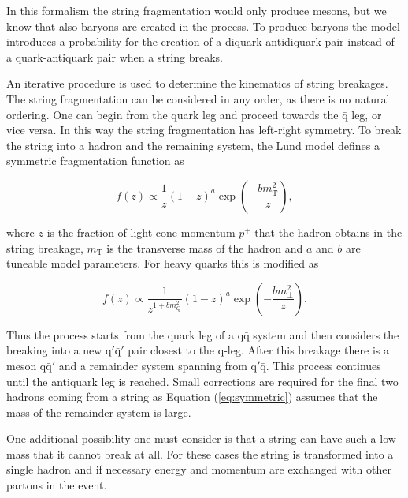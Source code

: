 In this formalism the string fragmentation would only produce mesons, but we know that also baryons are created in the process. To produce baryons the model introduces a probability for the creation of a diquark-antidiquark pair instead of a quark-antiquark pair when a string breaks. 

An iterative procedure is used to determine the kinematics of string breakages. The string fragmentation can be considered in any order, as there is no natural ordering. One can begin from the quark leg and proceed towards the $\bar{\mathrm{q}}$ leg, or vice versa. In this way the string fragmentation has left-right symmetry. To break the string into a hadron and the remaining system, the Lund model defines a symmetric fragmentation function as

\begin{equation}
f\left(z\right) \propto \frac{1}{z} \left(1-z\right)^a \exp \left(-\frac{b m_\mathrm{T} ^2}{z} \right),
\label{eq:symmetric}
\end{equation}

\noindent where $z$ is the fraction of light-cone momentum $p^+$ that the hadron obtains in the string breakage, $m_\mathrm{T}$ is the transverse mass of the hadron and $a$ and $b$ are tuneable model parameters. For heavy quarks this is modified as 

\begin{equation}
f\left(z\right) \propto \frac{1}{z^{1+bm_Q^2}} \left(1-z\right)^a \exp \left(-\frac{b m_\perp ^2}{z} \right).
\label{eq:symmetric2}
\end{equation}

\noindent Thus the process starts from the quark leg of a $\mathrm{q \bar{q}}$ system and then considers the breaking into a new $\mathrm{q' \bar q'}$ pair closest to the q-leg. After this breakage there is a meson $\mathrm{q \bar{q}'}$ and a remainder system spanning from $\mathrm{q' \bar{q}}$. This process continues until the antiquark leg is reached. Small corrections are required for the final two hadrons coming from a string as Equation (\ref{eq:symmetric}) assumes that the mass of the remainder system is large.

One additional possibility one must consider is that a string can have such a low mass that it cannot break at all. For these cases the string is transformed into a single hadron and if necessary energy and momentum are exchanged with other partons in the event.

